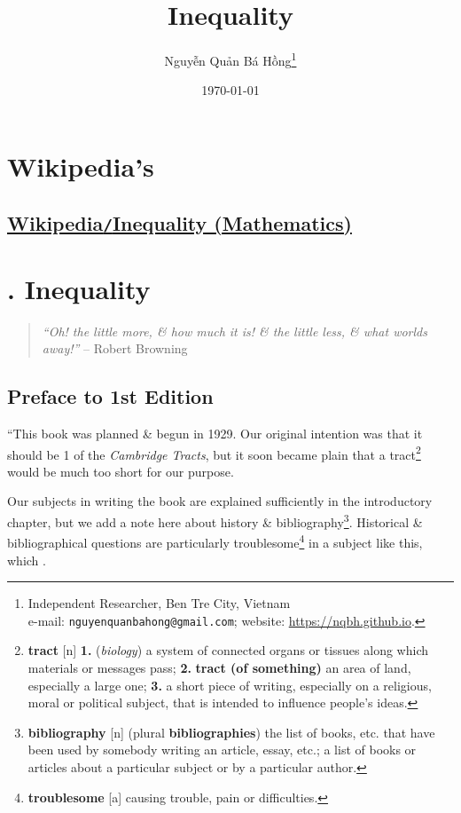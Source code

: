 \documentclass[oneside]{book}
\title{Inequality}
\author{\selectlanguage{vietnamese} Nguyễn Quản Bá Hồng\footnote{Independent Researcher, Ben Tre City, Vietnam\\e-mail: \texttt{nguyenquanbahong@gmail.com}; website: \url{https://nqbh.github.io}.}}
\date{\today}
\numberwithin{equation}{section}
\begin{document}
\maketitle
\setcounter{secnumdepth}{4}
\setcounter{tocdepth}{4}
\tableofcontents


\chapter{Wikipedia's}

\section{\href{https://en.wikipedia.org/wiki/Inequality_(mathematics)}{Wikipedia\texttt{/}Inequality (Mathematics)}}


\chapter{\cite{Hardy_Littlewood_Polya1952}. Inequality}

\begin{quotation}
	\textit{``Oh! the little more, \& how much it is! \& the little less, \& what worlds away!''} -- Robert Browning
\end{quotation}

\section*{Preface to 1st Edition}
``This book was planned \& begun in 1929. Our original intention was that it should be 1 of the \textit{Cambridge Tracts}, but it soon became plain that a tract\footnote{\textbf{tract} [n] \textbf{1.} (\textit{biology}) a system of connected organs or tissues along which materials or messages pass; \textbf{2.} \textbf{tract (of something)} an area of land, especially a large one; \textbf{3.} a short piece of writing, especially on a religious, moral or political subject, that is intended to influence people's ideas.} would be much too short for our purpose.

Our subjects in writing the book are explained sufficiently in the introductory chapter, but we add a note here about history \& bibliography\footnote{\textbf{bibliography} [n] (plural \textbf{bibliographies}) the list of books, etc. that have been used by somebody writing an article, essay, etc.; a list of books or articles about a particular subject or by a particular author.}. Historical \& bibliographical questions are particularly troublesome\footnote{\textbf{troublesome} [a] causing trouble, pain or difficulties.} in a subject like this, which .
\end{document}

